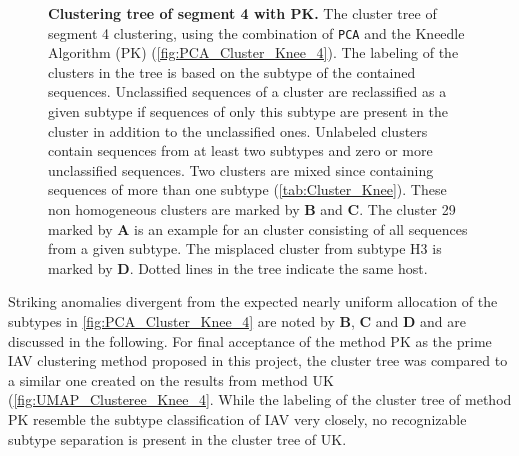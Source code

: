 \begin{figure}[!hbt]
    \caption[Clustering tree of segment 4 with PK]{\textbf{Clustering tree of segment 4 with PK.} The cluster tree of segment 4 clustering, using the combination of \texttt{PCA} and the Kneedle Algorithm (PK) (\autoref{fig:PCA_Cluster_Knee_4}). The labeling of the clusters in the tree is based on the subtype of the contained sequences. Unclassified sequences of a cluster are reclassified as a given subtype if sequences of only this subtype are present in the cluster in addition to the unclassified ones. Unlabeled clusters contain sequences from at least two subtypes and zero or more unclassified sequences. Two clusters are mixed since containing sequences of more than one subtype (\autoref{tab:Cluster_Knee}). These non homogeneous clusters are marked by \textbf{\textsf{B}} and \textbf{\textsf{C}}. The cluster 29 marked by \textbf{\textsf{A}} is an example for an cluster consisting of all sequences from a given subtype. The misplaced cluster from subtype H3 is marked by \textbf{\textsf{D}}. Dotted lines in the tree indicate the same host.}
    \label{fig:PCA_Clusteree_Knee_4}
\end{figure}

\vspace{1em}

Striking anomalies divergent from the expected nearly uniform allocation of the subtypes in \autoref{fig:PCA_Cluster_Knee_4} are noted by \textbf{\textsf{B}}, \textbf{\textsf{C}} and \textbf{\textsf{D}} and are discussed in the following. For final acceptance of the method PK as the prime \gls{IAV} clustering method proposed in this project, the cluster tree was compared to a similar one created on the results from method UK (\autoref{fig:UMAP_Clusteree_Knee_4}. While the labeling of the cluster tree of method PK resemble the subtype classification of \gls{IAV} very closely, no recognizable subtype separation is present in the cluster tree of UK. 
